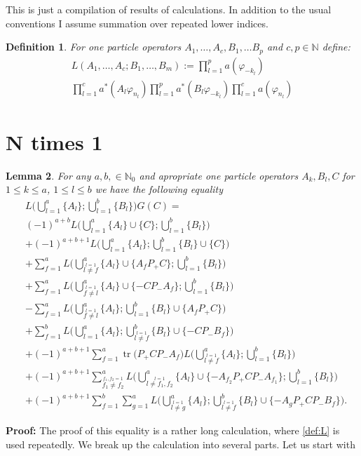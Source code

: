 \documentclass[b5paper,draft,openbib,12pt]{memoir}
\newtheorem{Def}{Definition}[section]
\newtheorem{Lemma}[Def]{Lemma}
\DeclareMathOperator{\tr}{tr}
\begin{document}
\frontmatter
%
\mainmatter

This is just a compilation of results of calculations. In addition to the usual conventions I assume summation over
repeated lower indices. 

\begin{Def}
For one particle operators \(A_1,\dots, A_c,B_1,\dots B_p \) and \(c,p\in\mathbb{N}\) define:
\begin{multline}\label{def:L}
L(A_1,\dots, A_c; B_1,\dots ,B_m):= \prod_{l=1}^p a(\varphi_{-k_l}) \\
\prod_{l=1}^c a^*(A_l \varphi_{n_l}) \prod_{l=1}^p a^*(B_l \varphi_{-k_l}) \prod_{l=1}^c a(\varphi_{n_l})
\end{multline}
\end{Def}


\section{N times 1}

\begin{Lemma} For any \(a,b,\in\mathbb{N}_0\) and apropriate one particle operators \(A_k, B_l, C\) for \(1\le k\le a\), \(1\le l\le b\) we have the following equality
\begin{align}
&L\Big(\bigcup_{l=1}^a \{A_l\}; \bigcup_{l=1}^b \{B_l\}\Big)G(C) =\\
 &(-1)^{a+b} L\Big(\bigcup_{l=1}^a \{A_l\}\cup \{C\}; \bigcup_{l=1}^b \{B_l\}\Big) \\
 &+(-1)^{a+b+1} L\Big(\bigcup_{l=1}^a \{A_l\}; \bigcup_{l=1}^b \{B_l\}\cup \{C\} \Big) \\
&+ \sum_{f=1}^a  L\Big(\bigcup_{\stackrel{l=1}{l\neq f}}^a \{A_l\}\cup \{A_fP_+C \}; \bigcup_{l=1}^b \{B_l\}\Big) \\
&+\sum_{f=1}^a
 L\Big(\bigcup_{\stackrel{l=1}{f\neq l}}^a \{A_l\}\cup \{- CP_- A_f\}; \bigcup_{l=1}^b \{B_l\}\Big)\\
& -\sum_{f=1}^a L\Big(\bigcup_{\stackrel{l=1}{f\neq l}}^a \{A_l\}; \bigcup_{l=1}^b \{B_l\}\cup \{A_f P_+ C\}\Big)\\
&+ \sum_{f=1}^b L\Big(\bigcup_{l=1}^a \{A_l\}; \bigcup_{\stackrel{l=1}{l\neq f}}^b \{B_l\}\cup \{-CP_- B_f\}\Big)\\
&+ (-1)^{a+b+1} \sum_{f=1}^a \tr \Big(P_+ C P_- A_f\Big) L\Big(\bigcup_{\stackrel{l=1}{l \neq f}}^a \{A_l\}; \bigcup_{l=1}^b \{B_l\}\Big)\\
&+ (-1)^{a+b+1} \sum_{\stackrel{f_1,f_2=1}{f_1\neq f_2}}^a L\Big(\bigcup_{\stackrel{l=1}{l\neq f_1,f_2}}^a \{A_l\}\cup \{-A_{f_2} P_+ C P_- A_{f_1}\}; \bigcup_{l=1}^b \{B_l\}\Big)\\
&+(-1)^{a+b+1} \sum_{f=1}^b \sum_{g=1}^a L\Big(\bigcup_{\stackrel{l=1}{l\neq g}}^a \{A_l\}; \bigcup_{\stackrel{l=1}{l\neq f}}^b \{B_l\}\cup \{-A_g P_+ C P_- B_f\}\Big).
\end{align}
\end{Lemma}
{\bfseries Proof:}  The proof of this equality is a rather long calculation, where \eqref{def:L} is used repeatedly. We break up the calculation into 
several parts. Let us start with
\end{document}
